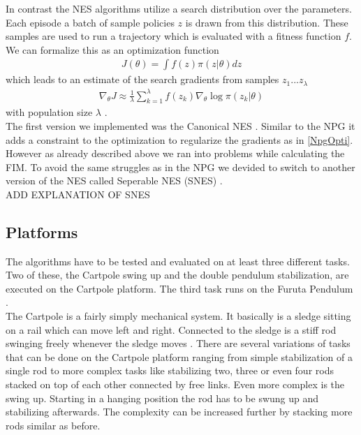In contrast the NES algorithms utilize a search distribution over the parameters. Each episode a batch of sample policies $z$ is drawn from this distribution. These samples are used to run a trajectory which is evaluated with a fitness function $f$. We can formalize this as an optimization function
\begin{align}
  J(\theta) = \int f(z) \pi(z|\theta) dz
\end{align}
which leads to an estimate of the search gradients from samples $z_1 ... z_{\lambda}$
\begin{align}
  \nabla_{\theta} J \approx \frac{1}{\lambda} \sum_{k=1}^{\lambda} f(z_k) \nabla_{\theta} \log \pi(z_k|\theta)
\end{align}
with population size $\lambda$ \cite{Wierstra14}. \\
The first version we implemented was the Canonical NES \cite{Wierstra14}. Similar to the NPG it adds a constraint to the optimization to regularize the gradients as in  \autoref{NpgOpti}. However as already described above we ran into problems while calculating the FIM. To avoid the same struggles as in the NPG we devided to switch to another version of the NES called Seperable NES (SNES) \cite{Wierstra14}.
\\ ADD EXPLANATION OF SNES

\subsection{Platforms}
\label{plats}
The algorithms have to be tested and evaluated on at least three different tasks. Two of these, the Cartpole swing up and the double pendulum stabilization, are executed on the Cartpole platform. The third task runs on the Furuta Pendulum \cite{Furuta1991}. \\

The Cartpole is a fairly simply mechanical system. It basically is a sledge sitting on a rail which can move left and right. Connected to the sledge is a stiff rod swinging freely whenever the sledge moves \cite{Barto1983}. There are several variations of tasks that can be done on the Cartpole platform ranging from simple stabilization of a single rod to more complex tasks like stabilizing two, three or even four rods stacked on top of each other connected by free links. Even more complex is the swing up. Starting in a hanging position the rod has to be swung up and stabilizing afterwards. The complexity can be increased further by stacking more rods similar as before. \\

